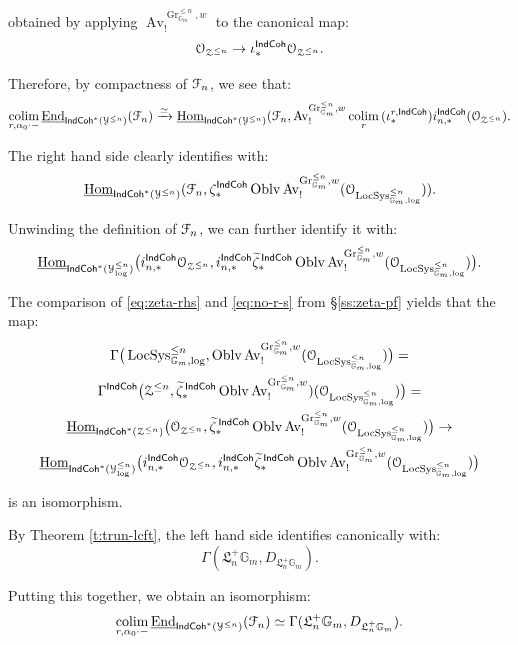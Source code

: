 \documentclass[reqno,11pt]{amsart}
\numberwithin{equation}{subsection}
\theoremstyle{remark}
\newcommand{\xar}[1]{\xrightarrow{#1}}
\newcommand{\rar}[1]{\xar{#1}}
\newcommand{\isom}{\rar{\simeq}}
\newcommand{\bG}{{\mathbb G}}
\newcommand{\sF}{{\EuScript F}}
\newcommand{\sO}{{\EuScript O}}
\newcommand{\sY}{{\EuScript Y}}
\newcommand{\sZ}{{\EuScript Z}}
\newcommand{\fL}{{\mathfrak L}}
\newcommand{\on}{\operatorname}
\newcommand{\ul}{\underline}
\newcommand{\End}{\on{End}}
\newcommand{\Hom}{\on{Hom}}
\newcommand{\Gr}{\on{Gr}}
\newcommand{\LocSys}{\on{LocSys}}
\newcommand{\colim}{\on{colim}}
\newcommand{\Oblv}{\on{Oblv}}
\newcommand{\Av}{\on{Av}}
\newcommand{\IndCoh}{\mathsf{IndCoh}}
\begin{document}
\noindent obtained by applying $\Av_!^{\Gr_{\bG_m}^{\leq n},w}$ to 
the canonical map:
%
\[
\sO_{\sZ^{\leq n}} \to \iota_*^{\IndCoh}\sO_{\sZ^{\leq n}}.
\]

Therefore, by compactness of $\sF_n$, we see that:
%
\[
\underset{r,\alpha_0\cdot-}{\colim} \, \ul{\End}_{\IndCoh^*(\sY^{\leq n})}(\sF_n)
\isom 
\ul{\Hom}_{\IndCoh^*(\sY^{\leq n})}(\sF_n, 
\Av_!^{\Gr_{\bG_m}^{\leq n},w} \underset{r}{\colim} \, 
(\iota_*^{r,\IndCoh})i_{n,*}^{\IndCoh}(\sO_{\sZ^{\leq n}}).
\]

\noindent The right hand side clearly identifies with:
%
\[
\ul{\Hom}_{\IndCoh^*(\sY^{\leq n})}(\sF_n, 
\zeta_*^{\IndCoh}
\Oblv\Av_!^{\Gr_{\bG_m}^{\leq n},w} (\sO_{\LocSys_{\bG_m,\log}^{\leq n}})).
\]

\noindent Unwinding the definition of $\sF_n$, we can further identify it with:
%
\[
\ul{\Hom}_{\IndCoh^*(\sY_{\log}^{\leq n})}\big(i_{n,*}^{\IndCoh}\sO_{\sZ^{\leq n}}, 
i_{n,*}^{\IndCoh}\widetilde{\zeta}_*^{\,\IndCoh}
\Oblv\Av_!^{\Gr_{\bG_m}^{\leq n},w} (\sO_{\LocSys_{\bG_m,\log}^{\leq n}})\big).
\]

\noindent The comparison of \eqref{eq:zeta-rhs} and \eqref{eq:no-r-s} 
from \S \ref{ss:zeta-pf} yields that the map:
%
\[
\begin{gathered}
\Gamma\big(\LocSys_{\bG_m,\log}^{\leq n},\Oblv\Av_!^{\Gr_{\bG_m}^{\leq n},w} (\sO_{\LocSys_{\bG_m,\log}^{\leq n}})\big) = \\
\Gamma^{\IndCoh}\big(\sZ^{\leq n},\widetilde{\zeta}_*^{\,\IndCoh}
\Oblv\Av_!^{\Gr_{\bG_m}^{\leq n},w})(\sO_{\LocSys_{\bG_m,\log}^{\leq n}})\big) = \\
\ul{\Hom}_{\IndCoh^*(\sZ^{\leq n})}\big(\sO_{\sZ^{\leq n}}, 
\widetilde{\zeta}_*^{\,\IndCoh}
\Oblv\Av_!^{\Gr_{\bG_m}^{\leq n},w} (\sO_{\LocSys_{\bG_m,\log}^{\leq n}})\big) \to \\
\ul{\Hom}_{\IndCoh^*(\sY_{\log}^{\leq n})}\big(i_{n,*}^{\IndCoh}\sO_{\sZ^{\leq n}}, 
i_{n,*}^{\IndCoh}\widetilde{\zeta}_*^{\,\IndCoh}
\Oblv\Av_!^{\Gr_{\bG_m}^{\leq n},w} (\sO_{\LocSys_{\bG_m,\log}^{\leq n}})\big)
\end{gathered}
\]

\noindent is an isomorphism. 

By Theorem \ref{t:trun-lcft}, the left hand side identifies canonically with:
%
\[
\Gamma(\fL_n^+ \bG_m,D_{\fL_n^+ \bG_m}).
\]

Putting this together, we obtain an isomorphism:
%
\[
\underset{r,\alpha_0\cdot-}{\colim} \, \ul{\End}_{\IndCoh^*(\sY^{\leq n})}(\sF_n)
\simeq 
\Gamma(\fL_n^+ \bG_m,D_{\fL_n^+ \bG_m}).
\] 
\end{document}
